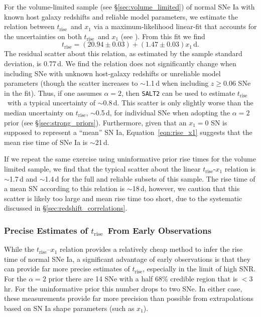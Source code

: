 \documentclass[twocolumn]{aastex63}
\newcommand{\trise}{$t_\mathrm{rise}$}
\begin{document}
For the volume-limited sample (see \S\ref{sec:volume_limited}) of normal SNe
Ia with known host galaxy redshifts and reliable model parameters, we estimate
the relation between \trise\ and $x_1$ via a maximum-likelihood linear-fit
that accounts for the uncertainties on both \trise\ and $x_1$ (see
\citealt{Hogg10}). From this fit we find
%
\begin{equation}
    t_\mathrm{rise} = (20.94 \pm 0.03) + (1.47 \pm 0.03)x_1\,\mathrm{d}.
    \label{eqn:rise_x1}
\end{equation} 
%
The residual scatter about this relation, as estimated by the sample standard
deviation, is 0.77\,d. We find the relation does not significantly change when
including SNe with unknown host-galaxy redshifts or unreliable model
parameters (though the scatter increases to $\sim$1.1\,d when including $z \ge
0.06$ SNe in the fit). Thus, if one assumes $\alpha = 2$, then \texttt{SALT2}
can be used to estimate \trise\ with a typical uncertainty of $\sim$0.8\,d.
This scatter is only slightly worse than the median uncertainty on \trise,
$\sim$0.5\,d, for individual SNe when adopting the $\alpha = 2$ prior (see
\S\ref{sec:strong_priors}). Furthermore, given that an $x_1 = 0$ SN is
supposed to represent a ``mean'' SN Ia, Equation~\ref{eqn:rise_x1} suggests
that the mean rise time of SNe Ia is $\sim$21\,d.

If we repeat the same exercise using uninformative prior rise times for the
volume limited sample, we find that the typical scatter about the linear
\trise-$x_1$ relation is $\sim$1.7\,d and $\sim$1.4\,d for the full and
reliable subsets of this sample. The rise time of a mean SN according to this
relation is $\sim$18\,d, however, we caution that this scatter is likely too
large and mean rise time too short, due to the systematic discussed in
\S\ref{sec:redshift_correlations}.

\subsubsection{Precise Estimates of \trise\ From Early Observations}

While the \trise--$x_1$ relation provides a relatively cheap method to infer
the rise time of normal SNe Ia, a significant advantage of early observations
is that they can provide far more precise estimates of \trise, especially in
the limit of high SNR. For the $\alpha = 2$ prior there are 14 SNe with a half
68\% credible region that is $< 3$\,hr. For the uninformative prior this
number drops to two SNe. In either case, these measurements provide far more
precision than possible from extrapolations based on SN Ia shape parameters
(such as $x_1$).
\end{document}
